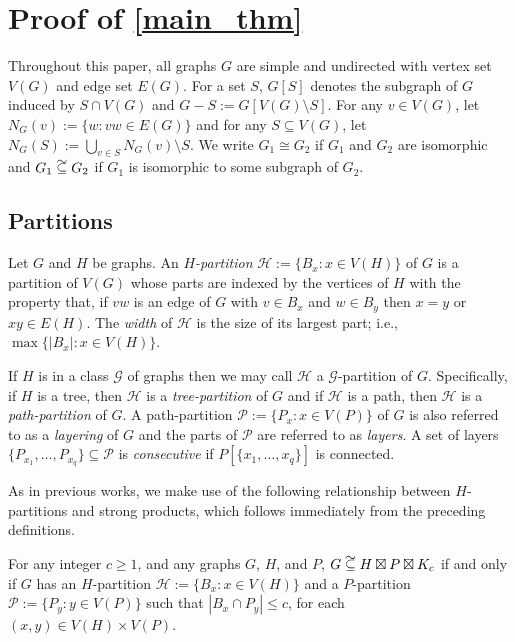 \documentclass{patmorin}
\newcommand{\defin}[1]{\emph{\color{brightmaroon}#1}}
\renewcommand{\le}{\leqslant}
\renewcommand{\ge}{\geqslant}
\newcommand\subsetcong{\mathrel{\text{%
    \setbox0\hbox{$\subseteq$}%
    \rlap{\hbox to \wd0{\hss\hss\hss\raisebox{1.5\height}{$\sim$}\hss}}\box0
}}}
\begin{document}
\section{Proof of \cref{main_thm}}

Throughout this paper, all graphs $G$ are simple and undirected with vertex set $V(G)$ and edge set $E(G)$.  For a set $S$, $G[S]$ denotes the subgraph of $G$ induced by $S\cap V(G)$ and $G-S:=G[V(G)\setminus S]$.  For any $v\in V(G)$, let $N_G(v):=\{w:vw\in E(G)\}$ and for any $S\subseteq V(G)$, let $N_G(S):=\bigcup_{v\in S} N_G(v)\setminus S$.  We write $G_1\cong G_2$ if $G_1$ and $G_2$ are isomorphic and $G_1\subsetcong G_2$ if $G_1$ is isomorphic to some subgraph of $G_2$.

\subsection{Partitions}

Let $G$ and $H$ be graphs.  An \defin{$H$-partition} $\mathcal{H}:=\{B_x:x\in V(H)\}$ of $G$ is a partition of $V(G)$ whose parts are indexed by the vertices of $H$ with the property that, if $vw$ is an edge of $G$ with $v\in B_x$ and $w\in B_y$ then $x=y$ or $xy\in E(H)$.  The \defin{width} of $\mathcal{H}$ is the size of its largest part; i.e., $\max\{|B_x|:x\in V(H)\}$.

If $H$ is in a class $\mathcal{G}$ of graphs then we may call $\mathcal{H}$ a $\mathcal{G}$-partition of $G$.  Specifically, if $H$ is a tree, then $\mathcal{H}$ is a \defin{tree-partition} of $G$ and if $\mathcal{H}$ is a path, then $\mathcal{H}$ is a \defin{path-partition} of $G$.  A path-partition $\mathcal{P}:=\{P_x:x\in V(P)\}$ of $G$ is also referred to as a \defin{layering} of $G$ and the parts of $\mathcal{P}$ are referred to as \defin{layers}.  A set of layers $\{P_{x_1},\ldots,P_{x_q}\}\subseteq\mathcal{P}$ is \defin{consecutive} if $P[\{x_1,\ldots,x_q\}]$ is connected.

As in previous works, we make use of the following relationship between $H$-partitions and strong products, which follows immediately from the preceding definitions.

\begin{obs}\label{partitions_vs_products}
  For any integer $c\ge 1$, and any graphs $G$, $H$, and $P$,  $G\subsetcong H\boxtimes P\boxtimes K_c$ if and only if $G$ has an $H$-partition $\mathcal{H}:=\{B_x:x\in V(H)\}$ and a $P$-partition $\mathcal{P}:=\{P_y:y\in V(P)\}$ such that $|B_x\cap P_y|\le c$, for each $(x,y)\in V(H)\times V(P)$.
\end{obs}
\end{document}
